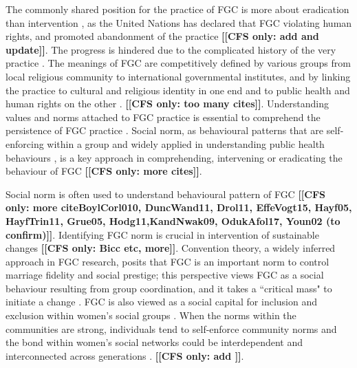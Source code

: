 \documentclass[12pt,]{article}
\newcommand{\comment}[1]{\textbf{[[#1]]}}
\newcommand{\cfonly}[1]{\comment{CFS only: #1}}
\begin{document}
The commonly shared position for the practice of FGC is more about eradication than intervention \cite{KhosBane17, Mack96, Toub94, UNIC16, WHO97}, as the United Nations has declared that FGC violating human rights, and promoted abandonment of the practice  \cite{WHO97, WHO08} \cfonly{add and update}.  The progress is hindered due to the complicated history of the very practice \cite{BergDeni12, Cami16}. The meanings of FGC are competitively defined by various groups from local religious community to international governmental institutes, and by linking the practice to cultural and religious identity in one end and to public health and human rights on the other \cite{AhmeKare18, BergDeni13a, Boyl02, BoylMcMo02, Grue01, KhosBane17, KimaShell18, SchuLien13, WHO12}. \cfonly{too many cites}.  Understanding values and norms attached to FGC practice is essential to comprehend the persistence of FGC practice \cite{}.  Social norm, as behavioural patterns that are self-enforcing within a group \cite{Youn15} and widely applied in understanding public health behaviours \cite{Ajze91, Ajze02, CislHeis18a,MollRima10, RimaLapi15}, is a key approach in comprehending,  intervening or eradicating the behaviour of FGC \cite{Bicc10, BiccMari15, Mack96, Mack00, MackLeJe08, RimaLapi15, Youn11, UNIC10, UNIC13} \cfonly{more cites}.

Social norm is often used to understand behavioural pattern of FGC \cfonly{more cite{BoylCorl010, DuncWand11, Drol11, EffeVogt15, Hayf05, HayfTrin11, Grue05, Hodg11,KandNwak09, OdukAfol17, Youn02} (to confirm)}.  Identifying FGC norm is crucial in intervention of sustainable changes \cite{EffeVogt15, RimaLapi15} \cfonly{Bicc etc, more}.  Convention theory, a widely inferred approach in FGC research, posits that FGC is an important norm to control marriage fidelity and social prestige; this perspective views FGC as a social behaviour resulting from group coordination, and it takes a ``critical mass" to initiate a change \cite{Mack00, MackLeJe08}.  FGC is also viewed as a social capital for inclusion and exclusion within women’s social groups \cite{Shel-Wand11}.  When the norms within the communities are strong, individuals tend to self-enforce community norms \cite{Ajze02, Hayf05, KandNwak09, KandShel19, Mack96, Mack06, MackLeJe08, ThomMadd92} and the bond within women's social networks could be interdependent and interconnected across generations  \cite{Mack00, DuncWand11, ShelWand11}. \cfonly{add \cite{Bicc15}}.  
\end{document}
